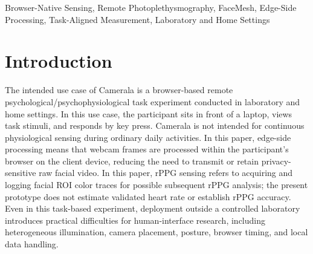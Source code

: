 \documentclass[dvipdfmx]{ehis}
\begin{document}
\begin{abstract}
Camerala is an edge-side, browser-native framework for remote psychophysiological experiments with rPPG sensing.
It synchronizes task events with face-image-derived feature records and exports local CSV/ZIP files without transmitting or storing raw facial video.
An exploratory N=1 author-participant deployment was evaluated as a 10-session, 600-trial browser-based task experiment in laboratory and home settings.
The deployment was assessed against a study-specific exploratory 80\% behavioral-response reference level and temporally alignable export of task-event and face-image-derived records.
The findings support a limited implementation-level conclusion under the tested author-participant, device, environment, posture, lighting, and task-execution context.
They do not establish general feasibility, robustness, validity in other settings, rPPG accuracy, or psychological/physiological effects.
\end{abstract}

\begin{keyword}
Browser-Native Sensing, Remote Photoplethysmography, FaceMesh, Edge-Side Processing, Task-Aligned Measurement, Laboratory and Home Settings
\end{keyword}

\maketitle

\section{Introduction}

The intended use case of Camerala is a browser-based remote psychological/psychophysiological task experiment conducted in laboratory and home settings.
In this use case, the participant sits in front of a laptop, views task stimuli, and responds by key press.
Camerala is not intended for continuous physiological sensing during ordinary daily activities.
In this paper, edge-side processing means that webcam frames are processed within the participant's browser on the client device, reducing the need to transmit or retain privacy-sensitive raw facial video.
In this paper, rPPG sensing refers to acquiring and logging facial ROI color traces for possible subsequent rPPG analysis; the present prototype does not estimate validated heart rate or establish rPPG accuracy.
Even in this task-based experiment, deployment outside a controlled laboratory introduces practical difficulties for human-interface research, including heterogeneous illumination, camera placement, posture, browser timing, and local data handling.
\end{document}

